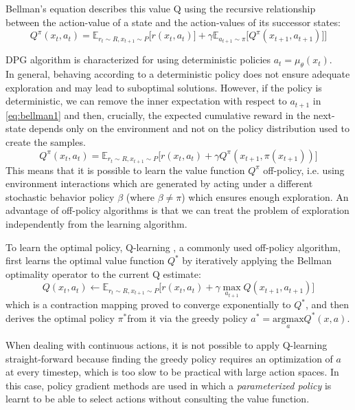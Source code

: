Bellman's equation describes this value Q using the 
recursive relationship between the action-value of a state and the action-values of its
successor states:
\begin{equation}
    Q^\pi(x_t,a_t) = \mathbb E_{r_t\sim R,x_{t+1} \sim P}\Big[ r(x_t,a_t)] + \gamma \mathbb E_{a_{t+1}\sim \pi}\big[Q^\pi(x_{t+1},a_{t+1})\big]\Big] \label{eq:bellman1}
\end{equation}

DPG algorithm \citep{silver2014b} is characterized for using deterministic policies $a_t=\mu_{\theta}(x_t)$.\\
In general, behaving according to a deterministic policy does not ensure adequate exploration
and may lead to suboptimal solutions. 
However, if the policy is deterministic, we can remove the inner expectation with respect 
to $a_{t+1}$ in \ref{eq:bellman1} and then, crucially, the expected cumulative reward in the next-state 
depends only on the environment and not on the policy distribution used to create the samples.
\begin{equation}
    Q^\pi(x_t,a_t) = \mathbb E_{r_t \sim R,x_{t+1} \sim P}\Big[ r(x_t,a_t) + \gamma Q^\pi(x_{t+1},\pi(x_{t+1}))\Big]
\end{equation}
\label{par:offpolicy}
This means that it is possible to learn the value function
$Q^\pi$ off-policy, i.e. using environment interactions which are generated by acting
under a different stochastic
behavior policy $\beta$ (where $\beta \neq \pi$) which ensures enough exploration.
An advantage of off-policy algorithms is that we can treat the problem of exploration
independently from the learning algorithm.

To learn the optimal policy, Q-learning \cite{Watkins1992}, a commonly used off-policy algorithm, first learns the optimal 
value function $Q^*$ by iteratively applying the Bellman optimality operator to the current Q estimate:
\begin{equation}
    Q(x_t,a_t) \leftarrow \mathbb E_{r_t \sim R,x_{t+1} \sim P}\Big[ r(x_t,a_t) + \gamma \underset{a_{t+1}} \max Q(x_{t+1},a_{t+1})\Big]
\end{equation}
which is a contraction mapping proved to converge exponentially to $Q^*$, and then
derives the optimal policy $\pi^*$from it via the greedy policy $a^*=\underset{a}{\text{argmax}} Q^*(x,a)$.

When dealing with continuous actions, it is not possible to apply Q-learning
straight-forward because finding the greedy policy requires an optimization of $a$ at 
every timestep, which is too slow to be practical with large action spaces.
In this case, policy gradient methods are used in which a \textit{parameterized policy} is learnt 
to be able to select actions without consulting the value function.


